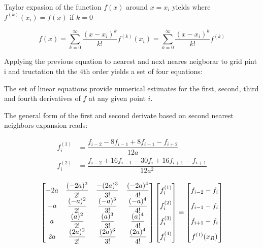 Taylor expasion of the function $f(x)$ around $x=x_i$ yields where $f^{(k)}(x_i) = f(x)$ if $k=0$

$$f(x) = \sum\limits_{k=0}^{\infty} \dfrac{(x-x_i)^k}{k!}f^{(k)}(x_i) = \sum\limits_{k=0}^{\infty} \dfrac{(x-x_i)^k}{k!}f^{(k)}$$

Applying the previous equation to nearest and next neares neigborar to grid pint i and tructation tht the 4th order yields a set of four equations:

The set of linear equations provide numerical estimates for the first, second, third and fourth derivatives of $f$ at any given point $i$.

The general form of the first and second derivate based on second nearest neighbors expansion reads:

\begin{align} \label{eq:nn}
f^{(1)}_i &= \dfrac{f_{i-2}-8f_{i-1} + 8f_{i+1} - f_{i+2}}{12a} \\
f^{(2)}_i &= \dfrac{f_{i-2}+16f_{i-1} -30f_{i} + 16f_{i+1} - f_{i+1}}{12a^2}
\end{align}


\begin{align}
\begin{bmatrix} \label{eq:matrix4}
    -2a & \dfrac{(-2a)^2}{2!} & \dfrac{-(2a)^3}{3!} & \dfrac{(-2a)^4}{4!}\\
    -a & \dfrac{(-a)^2}{2!} & \dfrac{(-a)^3}{3!} & \dfrac{(-a)^4}{4!}\\
    a & \dfrac{(a)^2}{2!} & \dfrac{(a)^3}{3!} & \dfrac{(a)^4}{4!}\\
    2a & \dfrac{(2a)^2}{2!} & \dfrac{(2a)^3}{3!} & \dfrac{(2a)^4}{4!}
\end{bmatrix}
\begin{bmatrix}
    f_i^{(1)}  \vphantom{ \dfrac{d^4}{d} }\\
    f_i^{(2)}  \vphantom{ \dfrac{d^4}{d} } \\
    f_i^{(3)}  \vphantom{ \dfrac{d^4}{d} } \\
    f_i^{(4)}  \vphantom{ \dfrac{d^4}{d} }
\end{bmatrix}
=
\begin{bmatrix}
    f_{i-2} - f_{i}    \vphantom{ \dfrac{d^4}{d}} \\
    f_{i-1} - f_{i}    \vphantom{ \dfrac{d^4}{d}} \\
    f_{i+1} - f_{i}    \vphantom{ \dfrac{d^4}{d}} \\
    f^{(1)}(x_R)   \vphantom{ \dfrac{d^4}{d}}
\end{bmatrix}
\end{align}

